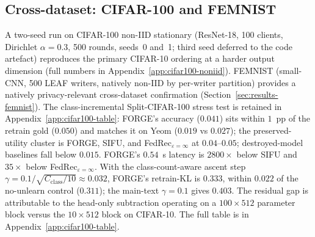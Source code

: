 \subsection{Cross-dataset: CIFAR-100 and FEMNIST}
\label{sec:results-cifar100}

A two-seed run on CIFAR-100 non-IID stationary (ResNet-18, 100 clients,
Dirichlet $\alpha{=}0.3$, 500 rounds, seeds~0 and~1; third seed deferred to the
code artefact) reproduces the primary CIFAR-10 ordering at a harder output
dimension (full numbers in Appendix~\ref{app:cifar100-noniid}).
FEMNIST (small-CNN, 500 LEAF writers, natively non-IID by per-writer partition)
provides a natively privacy-relevant cross-dataset confirmation
(Section~\ref{sec:results-femnist}). The class-incremental Split-CIFAR-100 stress
test is retained in Appendix~\ref{app:cifar100-table}: FORGE's accuracy
($0.041$) sits within $1$~pp of the retrain gold ($0.050$) and matches it on
Yeom ($0.019$ vs $0.027$); the preserved-utility cluster is FORGE, SIFU, and
FedRec$_{\varepsilon=\infty}$ at $0.04$--$0.05$; destroyed-model baselines fall
below $0.015$. FORGE's $0.54$~s latency is $2800\times$ below SIFU and
$35\times$ below FedRec$_{\varepsilon=\infty}$. With the class-count-aware ascent
step $\gamma = 0.1/\sqrt{C_\mathrm{class}/10} \approx 0.032$, FORGE's retrain-KL
is $0.333$, within $0.022$ of the no-unlearn control ($0.311$); the main-text
$\gamma = 0.1$ gives $0.403$. The residual gap is attributable to the head-only
subtraction operating on a $100 \times 512$ parameter block versus the $10 \times
512$ block on CIFAR-10. The full table is
in Appendix~\ref{app:cifar100-table}.
